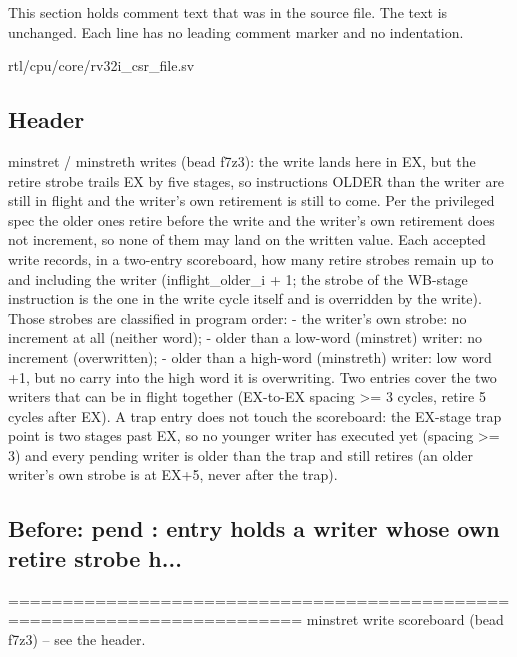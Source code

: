 This section holds comment text that was in the source file. The text is unchanged. Each line has no leading comment marker and no indentation.

\begin{relocated}{rtl/cpu/core/rv32i_csr_file.sv}

\subsection*{Header}

\begin{textblock}
minstret / minstreth writes (bead f7z3): the write lands here in EX, but the
retire strobe trails EX by five stages, so instructions OLDER than the writer
are still in flight and the writer's own retirement is still to come.  Per the
privileged spec the older ones retire before the write and the writer's own
retirement does not increment, so none of them may land on the written value.
Each accepted write records, in a two-entry scoreboard, how many retire strobes
remain up to and including the writer (inflight_older_i + 1; the strobe of the
WB-stage instruction is the one in the write cycle itself and is overridden by
the write).  Those strobes are classified in program order:
  - the writer's own strobe: no increment at all (neither word);
  - older than a low-word (minstret) writer: no increment (overwritten);
  - older than a high-word (minstreth) writer: low word +1, but no carry into
    the high word it is overwriting.
Two entries cover the two writers that can be in flight together (EX-to-EX
spacing >= 3 cycles, retire 5 cycles after EX).  A trap entry does not touch the
scoreboard: the EX-stage trap point is two stages past EX, so no younger writer has
executed yet (spacing >= 3) and every pending writer is older than the trap and
still retires (an older writer's own strobe is at EX+5, never after the trap).
\end{textblock}

\subsection*{Before: pend    : entry holds a writer whose own retire strobe h...}

\begin{textblock}
=========================================================================
minstret write scoreboard (bead f7z3) -- see the header.
\end{textblock}


\end{relocated}
